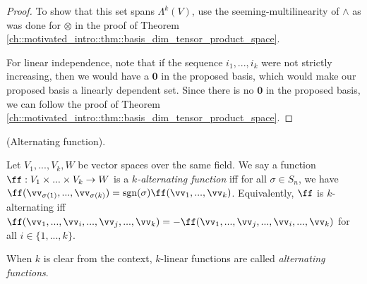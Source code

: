 \begin{proof}
   To show that this set spans $\Lambda^k(V)$, use the seeming-multilinearity of $\wedge$ as was done for $\otimes$ in the proof of Theorem \ref{ch::motivated_intro::thm::basis_dim_tensor_product_space}.
   
   For linear independence, note that if the sequence $i_1, ..., i_k$ were not strictly increasing, then we would have a $\mathbf{0}$ in the proposed basis, which would make our proposed basis a linearly dependent set. Since there is no $\mathbf{0}$ in the proposed basis, we can follow the proof of Theorem \ref{ch::motivated_intro::thm::basis_dim_tensor_product_space}.
\end{proof}


\begin{defn}
    (Alternating function).
    
    Let $V_1, ..., V_k, W$ be vector spaces over the same field. We say a function $\ff:V_1 \times ... \times V_k \rightarrow W$ is a \textit{$k$-alternating function} iff for all $\sigma \in S_n$, we have $\ff(\vv_{\sigma(1)}, ..., \vv_{\sigma(k)}) = \sgn(\sigma) \ff(\vv_1, ..., \vv_k)$. Equivalently, $\ff$ is $k$-alternating iff $\ff(\vv_1, ..., \vv_i, ..., \vv_j, ..., \vv_k) = -\ff(\vv_1, ..., \vv_j, ..., \vv_i, ..., \vv_k)$ for all $i \in \{1, ..., k\}$.
    
    When $k$ is clear from the context, $k$-linear functions are called \textit{alternating functions}.
\end{defn}

